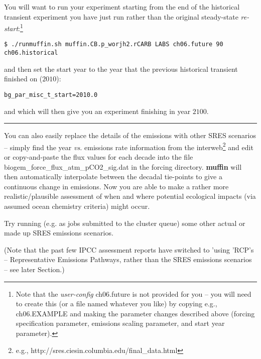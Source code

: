 You will want to run your experiment starting from the end of the historical transient experiment you have just run rather than the original steady-state \textit{re-start}:\footnote{Note that the \textit{user-config} \footnotesize\textsf{ch06.future }\normalsize is not provided for you – you will need to create this (or a file named whatever you like) by copying e.g., \footnotesize\textsf{ch06.EXAMPLE }\normalsize and making the parameter changes described above (forcing specification parameter, emissions scaling parameter, and start year parameter).}
\vspace{-2pt}\small\begin{verbatim}
$ ./runmuffin.sh muffin.CB.p_worjh2.rCARB LABS ch06.future 90 ch06.historical
\end{verbatim}\normalsize\vspace{-2pt}
and then set the start year to the year that the previous historical transient finished on (\(2010\)):
\vspace{-2pt}\small\begin{verbatim}
bg_par_misc_t_start=2010.0
\end{verbatim}\normalsize\vspace{-2pt}
and which will then give you an experiment finishing in year \(2100\).

\vspace{1mm}
\noindent\rule{4cm}{0.1mm}
\vspace{2mm}

\noindent You can also easily replace the details of the emissions with other SRES scenarios – simply find the year \textit{vs.} emissions rate information from the interweb\footnote{e.g., http://sres.ciesin.columbia.edu/final\_data.html} and edit or copy-and-paste the flux values for each decade into the file \footnotesize\textsf{biogem\_force\_flux\_atm\_pCO2\_sig.dat }\normalsize in the forcing directory.\textbf{ muffin} will then automatically interpolate between the decadal tie-points to give a continuous change in emissions. Now you are able to make a rather more realistic/plausible assessment of when and where potential ecological impacts (via assumed ocean chemistry criteria) might occur.

Try running (e.g. as jobs submitted to the cluster queue) some other actual or made up SRES emissions scenarios.

(Note that the past few IPCC assessment reports have switched to 'using 'RCP's -- Representative Emissions Pathways, rather than the SRES emissions scenarios -- see later Section.)

